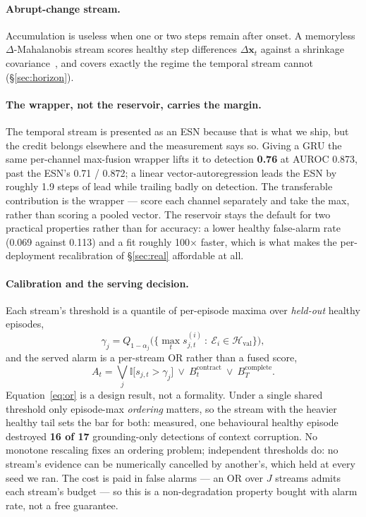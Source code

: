 \documentclass{article}
\begin{document}
\paragraph{Abrupt-change stream.} Accumulation is useless when one or two steps
remain after onset. A memoryless $\Delta$-Mahalanobis stream scores healthy
step differences $\Delta\mathbf{x}_t$ against a shrinkage
covariance~\cite{lee2018simple}, and covers exactly the regime the temporal
stream cannot (\S\ref{sec:horizon}).

\paragraph{The wrapper, not the reservoir, carries the margin.} The temporal
stream is presented as an ESN because that is what we ship, but the credit
belongs elsewhere and the measurement says so. Giving a GRU the same
per-channel max-fusion wrapper lifts it to detection \textbf{0.76} at AUROC
0.873, past the ESN's 0.71 / 0.872; a linear vector-autoregression leads the
ESN by roughly 1.9 steps of lead while trailing badly on detection. The
transferable contribution is the wrapper --- score each channel separately and
take the max, rather than scoring a pooled vector. The reservoir stays the
default for two practical properties rather than for accuracy: a lower healthy
false-alarm rate (0.069 against 0.113) and a fit roughly 100$\times$ faster,
which is what makes the per-deployment recalibration of \S\ref{sec:real}
affordable at all.

\paragraph{Calibration and the serving decision.} Each stream's threshold is a
quantile of per-episode maxima over \emph{held-out} healthy episodes,
\begin{equation}
\gamma_j=Q_{1-\alpha_j}\Big(\big\{\textstyle\max_t s^{(i)}_{j,t}\ :\
\mathcal{E}_i\in\mathcal{H}_{\mathrm{val}}\big\}\Big),
\label{eq:threshold}
\end{equation}
and the served alarm is a per-stream OR rather than a fused score,
\begin{equation}
A_t=\bigvee_j \mathbb{I}\big[s_{j,t}>\gamma_j\big]\ \vee\ B^{\text{contract}}_t
\ \vee\ B^{\text{complete}}_T .
\label{eq:or}
\end{equation}
Equation~\eqref{eq:or} is a design result, not a formality. Under a single
shared threshold only episode-max \emph{ordering} matters, so the stream with
the heavier healthy tail sets the bar for both: measured, one behavioural
healthy episode destroyed \textbf{16 of 17} grounding-only detections of
context corruption. No monotone rescaling fixes an ordering problem;
independent thresholds do: no stream's evidence can be numerically cancelled by
another's, which held at every seed we ran. The cost is paid in false alarms ---
an OR over $J$ streams admits each stream's budget --- so this is a
non-degradation property bought with alarm rate, not a free guarantee.
\end{document}
